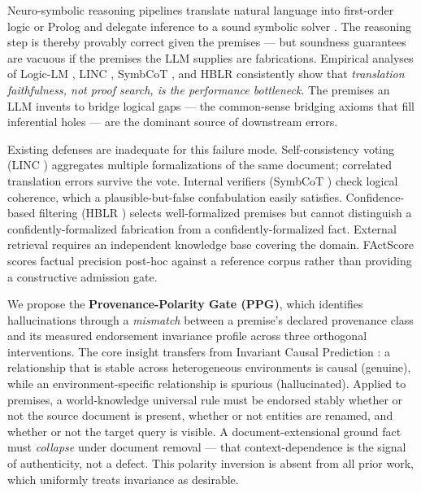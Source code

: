 \documentclass[11pt,letterpaper]{article}
\begin{document}
Neuro-symbolic reasoning pipelines translate natural language into first-order logic or Prolog and delegate inference to a sound symbolic solver \citep{Pan2023,Olausson2023}. The reasoning step is thereby provably correct given the premises --- but soundness guarantees are vacuous if the premises the LLM supplies are fabrications. Empirical analyses of Logic-LM \citep{Pan2023}, LINC \citep{Olausson2023}, SymbCoT \citep{Liu2024}, and HBLR \citep{Li2025} consistently show that \textit{translation faithfulness, not proof search, is the performance bottleneck}. The premises an LLM invents to bridge logical gaps --- the common-sense bridging axioms that fill inferential holes --- are the dominant source of downstream errors.

Existing defenses are inadequate for this failure mode. Self-consistency voting (LINC \citep{Olausson2023}) aggregates multiple formalizations of the same document; correlated translation errors survive the vote. Internal verifiers (SymbCoT \citep{Liu2024}) check logical coherence, which a plausible-but-false confabulation easily satisfies. Confidence-based filtering (HBLR \citep{Li2025}) selects well-formalized premises but cannot distinguish a confidently-formalized fabrication from a confidently-formalized fact. External retrieval \citep{Qin2025} requires an independent knowledge base covering the domain. FActScore \citep{Min2023} scores factual precision post-hoc against a reference corpus rather than providing a constructive admission gate.

We propose the \textbf{Provenance-Polarity Gate (PPG)}, which identifies hallucinations through a \textit{mismatch} between a premise's declared provenance class and its measured endorsement invariance profile across three orthogonal interventions. The core insight transfers from Invariant Causal Prediction \citep{Peters2016}: a relationship that is stable across heterogeneous environments is causal (genuine), while an environment-specific relationship is spurious (hallucinated). Applied to premises, a world-knowledge universal rule must be endorsed stably whether or not the source document is present, whether or not entities are renamed, and whether or not the target query is visible. A document-extensional ground fact must \textit{collapse} under document removal --- that context-dependence is the signal of authenticity, not a defect. This polarity inversion is absent from all prior work, which uniformly treats invariance as desirable.
\end{document}
